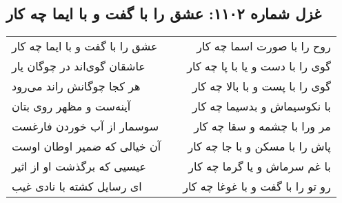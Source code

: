 \begin{center}
\section*{غزل شماره ۱۱۰۲: عشق را با گفت و با ایما چه کار}
\label{sec:1102}
\begin{longtable}{l p{0.5cm} r}
عشق را با گفت و با ایما چه کار
&&
روح را با صورت اسما چه کار
\\
عاشقان گوی‌اند در چوگان یار
&&
گوی را با دست و یا با پا چه کار
\\
هر کجا چوگانش راند می‌رود
&&
گوی را با پست و با بالا چه کار
\\
آینه‌ست و مظهر روی بتان
&&
با نکوسیماش و بدسیما چه کار
\\
سوسمار از آب خوردن فارغست
&&
مر ورا با چشمه و سقا چه کار
\\
آن خیالی که ضمیر اوطان اوست
&&
پاش را با مسکن و با جا چه کار
\\
عیسیی که برگذشت او از اثیر
&&
با غم سرماش و یا گرما چه کار
\\
ای رسایل کشته با نادی غیب
&&
رو تو را با گفت و با غوغا چه کار
\\
\end{longtable}
\end{center}
